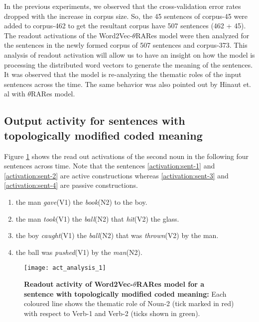 In the previous experiments, we observed that the cross-validation error rates dropped with the increase in corpus size. So, the 45 sentences of corpus-45 were added to corpus-462 to get the resultant corpus have 507 sentences (462 + 45). The readout activations of the Word2Vec-$\theta$RARes model were then analyzed for the sentences in the newly formed corpus of 507 sentences and corpus-373. This analysis of readout activation will allow us to have an insight on how the model is processing the distributed word vectors to generate the meaning of the sentences. It was observed that the model is re-analyzing the thematic roles of the input sentences across the time. The same behavior was also pointed out by Hinaut et. al \cite{tra:xavier_hri, xavier:2013:RT} with $\theta$RARes model.

\subsection{Output activity for sentences with topologically modified coded meaning}

Figure \ref{fig:act_analysis_1} shows the read out activations of the second noun in the following four sentences across time. Note that the sentences \ref{activation:sent-1} and \ref{activation:sent-2} are active constructions whereas \ref{activation:sent-3} and \ref{activation:sent-4} are passive constructions.

\begin{enumerate}[noitemsep]
\item the man \textit{gave}(V1) the \textit{book}(N2) to the boy. \label{activation:sent-1}
\item the man \textit{took}(V1) the \textit{ball}(N2) that \textit{hit}(V2) the glass. \label{activation:sent-2}
\item the boy \textit{caught}(V1) the \textit{ball}(N2) that was \textit{thrown}(V2) by the man.  \label{activation:sent-3} 
\item the ball was \textit{pushed}(V1) by the \textit{man}(N2).  \label{activation:sent-4}
\end{enumerate}

\begin{figure}[hbtp]
\centering
\texttt{[image: act\_analysis\_1]}
\caption[Readout activity of Word2Vec-$\theta$RARes model for a sentence with topologically modified coded meaning.]{\textbf{Readout activity of Word2Vec-$\theta$RARes model for a sentence with topologically modified coded meaning: } {\small Each coloured line shows the thematic role of Noun-2 (tick marked in red) with respect to Verb-1 and Verb-2 (ticks shown in green).}}
\label{fig:act_analysis_1}
\end{figure}

